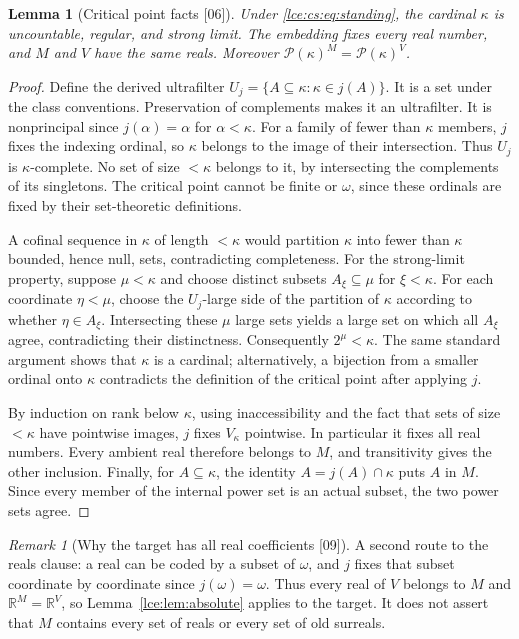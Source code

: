 \documentclass[11pt,letterpaper]{article}
\numberwithin{equation}{section}
\newtheorem{lemma}[theorem]{Lemma}
\theoremstyle{definition}
\theoremstyle{remark}
\newtheorem{remark}[theorem]{Remark}
\newcommand{\R}{\mathbb R}
\newcommand{\Pow}{\mathcal P}
\newcommand{\leref}[1]{Lemma~\ref{#1}}
\newcommand{\src}[1]{\textup{\textsf{\small[#1]}}}%
\begin{document}
\begin{lemma}[Critical point facts \src{06}]\label{lce:cs:lem:critical}
Under \eqref{lce:cs:eq:standing}, the cardinal $\kappa$ is uncountable,
regular, and strong limit. The embedding fixes every real number, and $M$
and $V$ have the same reals. Moreover $\Pow(\kappa)^M=\Pow(\kappa)^V$.
\end{lemma}
\begin{proof}
Define the derived ultrafilter $U_j=\{A\subseteq\kappa:\kappa\in j(A)\}$. It
is a set under the class conventions. Preservation of complements makes it
an ultrafilter. It is nonprincipal since $j(\alpha)=\alpha$ for
$\alpha<\kappa$. For a family of fewer than $\kappa$ members, $j$ fixes the
indexing ordinal, so $\kappa$ belongs to the image of their intersection.
Thus $U_j$ is $\kappa$-complete. No set of size $<\kappa$ belongs to it, by
intersecting the complements of its singletons. The critical point cannot
be finite or $\omega$, since these ordinals are fixed by their
set-theoretic definitions.

A cofinal sequence in $\kappa$ of length $<\kappa$ would partition $\kappa$
into fewer than $\kappa$ bounded, hence null, sets, contradicting
completeness. For the strong-limit property, suppose $\mu<\kappa$ and choose
distinct subsets $A_\xi\subseteq\mu$ for $\xi<\kappa$. For each coordinate
$\eta<\mu$, choose the $U_j$-large side of the partition of $\kappa$
according to whether $\eta\in A_\xi$. Intersecting these $\mu$ large sets
yields a large set on which all $A_\xi$ agree, contradicting their
distinctness. Consequently $2^\mu<\kappa$. The same standard argument shows
that $\kappa$ is a cardinal; alternatively, a bijection from a smaller
ordinal onto $\kappa$ contradicts the definition of the critical point after
applying $j$.

By induction on rank below $\kappa$, using inaccessibility and the fact
that sets of size $<\kappa$ have pointwise images, $j$ fixes $V_\kappa$
pointwise. In particular it fixes all real numbers. Every ambient real
therefore belongs to $M$, and transitivity gives the other inclusion.
Finally, for $A\subseteq\kappa$, the identity $A=j(A)\cap\kappa$ puts $A$ in
$M$. Since every member of the internal power set is an actual subset, the
two power sets agree.
\end{proof}

\begin{remark}[Why the target has all real coefficients \src{09}]
\label{lce:sg:rem:reals}
A second route to the reals clause: a real can be coded by a subset of
$\omega$, and $j$ fixes that subset coordinate by coordinate since
$j(\omega)=\omega$. Thus every real of $V$ belongs to $M$ and
$\R^M=\R^V$, so \leref{lce:lem:absolute} applies to the target. It does not
assert that $M$ contains every set of reals or every set of old surreals.
\end{remark}
\end{document}

